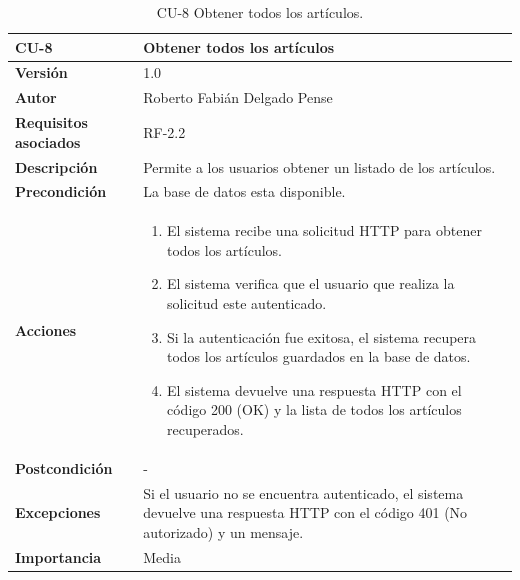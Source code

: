 \begin{table}[p]
	\centering
	\begin{tabularx}{\linewidth}{ p{} p{} }
		\toprule
		\textbf{CU-8}    & \textbf{Obtener todos los artículos}\\
		\toprule
		\textbf{Versión}              & 1.0    \\
		\textbf{Autor}                & Roberto Fabián Delgado Pense \\
		\textbf{Requisitos asociados} & RF-2.2 \\ 
		\textbf{Descripción}          & Permite a los usuarios obtener un listado de los                                             artículos. \\
		\textbf{Precondición}         & La base de datos esta disponible. \\
		\textbf{Acciones}             &
		\begin{enumerate}
			\def\labelenumi{\arabic{enumi}.}
			\tightlist
			\item El sistema recibe una solicitud HTTP para obtener todos los artículos.
			\item El sistema verifica que el usuario que realiza la solicitud este autenticado.
                \item Si la autenticación fue exitosa, el sistema recupera todos los artículos guardados en la base        de datos.
                \item El sistema devuelve una respuesta HTTP con el código 200 (OK) y la lista de todos los artículos        recuperados.
            \end{enumerate}\\
		\textbf{Postcondición}        & - \\
		\textbf{Excepciones}          & Si el usuario no se encuentra autenticado, el sistema devuelve una respuesta HTTP con el código            401 (No autorizado) y un mensaje. \\
		\textbf{Importancia}          & Media \\
		\bottomrule
	\end{tabularx}
	\caption{CU-8 Obtener todos los artículos.}
\end{table}


